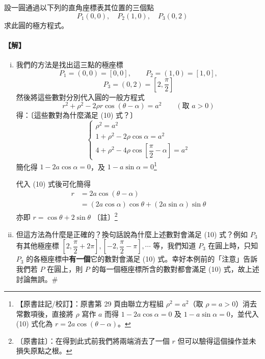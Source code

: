 \medskip
\begin{example}\label{ex:b5s-1-3-3}
設一圓通過以下列的直角座標表其位置的三個點
\[
  P_1(0, 0), \quad P_2(1, 0), \quad P_3(0, 2)
\]
求此圓的極方程式。
\end{example}
\paragraph{【解】}
\begin{enumerate}[(i)]
  \item 我們的方法是找出這三點的極座標
  \[
    P_1 = (0, 0) = [0, 0], \qquad P_2 = (1, 0) = [1, 0],
  \]
  \[
    P_3 = (0, 2) = \left[2, \frac{\pi}{2}\right]
  \]
  然後將這些數對分別代入圓的一般方程式
  \begin{equation}\label{eq:b5s-1-3-10}
    r^2 + \rho^2 - 2\rho r\cos(\theta - \alpha) = a^2 \qquad (\text{取 } a > 0) \tag{10}
  \end{equation}
  得：〔這些數對為什麼滿足 (10) 式？〕
  \[
    \begin{cases}
      \rho^2 = a^2 \\
      1 + \rho^2 - 2\rho\cos\alpha = a^2 \\
      4 + \rho^2 - 4\rho\cos\left[\dfrac{\pi}{2} - \alpha\right] = a^2
    \end{cases}
  \]
  簡化得 $1 - 2a\cos\alpha = 0$，及 $1 - a\sin\alpha = 0$\label{note:b5s-ch1-p29-ex3}\footnote{【原書註記/校訂】：原書第 29 頁由聯立方程組 $\rho^2 = a^2$（取 $\rho = a > 0$）消去常數項後，直接將 $\rho$ 寫作 $a$ 而得 $1 - 2a\cos\alpha = 0$ 及 $1 - a\sin\alpha = 0$，並代入 (10) 式化為 $r = 2a\cos(\theta - \alpha)$。}

  代入 (10) 式後可化簡得
  \begin{align*}
    r &= 2a\cos(\theta - \alpha) \\
      &= (2a\cos\alpha)\cos\theta + (2a\sin\alpha)\sin\theta
  \end{align*}
  亦即 \qquad $r = \cos\theta + 2\sin\theta$ \qquad 〔註〕\footnote{〔原書註〕：在得到此式前我們將兩端消去了一個 $r$ 但可以驗得這個操作並未損失原點之根。}

  \item 但這方法為什麼是正確的？換句話說為什麼上述數對會滿足 (10) 式？例如 $P_3$ 有其他極座標 $\left[2, \dfrac{\pi}{2} + 2\pi\right], \left[-2, \dfrac{\pi}{2} - \pi\right], \cdots$ 等，我們知道 $P_3$ 在圓上時，只知 $P_3$ 的各極座標中\textbf{有一個}它的數對會滿足 (10) 式。幸好本例前的「注意」告訴我們若 $P$ 在圓上，則 $P$ 的每一個極座標所含的數對都會滿足 (10) 式，故上述討論無誤。\hfill$\#$
\end{enumerate}

